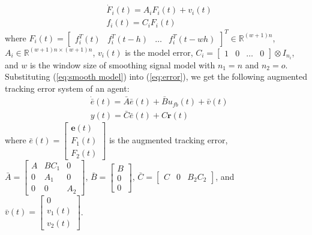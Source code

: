 \documentclass{ieeeaccess}
\newtheorem{remark}{Remark}
\begin{document}
\begin{equation} \label{eq:smooth model}
    \begin{split}
        & \dot{F}_i(t)=A_iF_i(t)+v_i(t) \\
        & f_i(t)=C_iF_i(t)        
    \end{split}
\end{equation}
where $F_i(t)=\begin{bmatrix}
    f_i^T(t) & f_i^T(t-h) & \dots & f_i^T(t-wh)
\end{bmatrix}^T\in\mathbb{R}^{(w+1)n}$, $A_i\in\mathbb{R}^{{(w+1)n}\times{(w+1)n}}$, $v_i(t)$ is the model error, $C_i=\begin{bmatrix}
        1 & 0 & \dots & 0
    \end{bmatrix}\otimes I_{n_i}$, and $w$ is the window size of smoothing signal model with $n_1=n$ and $n_2 = o$. Substituting (\ref{eq:smooth model}) into (\ref{eq:error}), we get the following augmented tracking error system of an agent:
\begin{equation} \label{eq:e_bar}
    \begin{split}
        & \dot{\bar{e}}(t) = \bar{A}\bar{e}(t)+\bar{B}u_{fb}(t)+\bar{v}(t) \\
        & y(t)=\bar{C}\bar{e}(t) + C\pmb{r}(t)
    \end{split}
\end{equation}
where $\bar{e}(t) = \begin{bmatrix}
    \pmb{e}(t) \\ F_1(t) \\ F_2(t)
\end{bmatrix}$ is the augmented tracking error, $\bar{A}=\begin{bmatrix}
    A & BC_1 & 0 \\
    0 & A_1 & 0 \\
    0 & 0 & A_2
\end{bmatrix}$, $\bar{B}=\begin{bmatrix}
    B \\ 0 \\ 0
\end{bmatrix}$, $\bar{C}=\begin{bmatrix}
    C & 0 & B_2C_2
\end{bmatrix}$, and $\bar{v}(t)=\begin{bmatrix}
    0 \\ v_1(t) \\ v_2(t)
\end{bmatrix}$.
\end{document}
